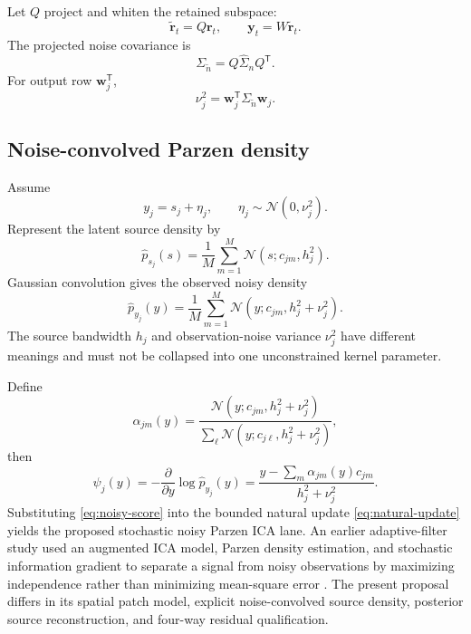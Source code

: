 \documentclass[11pt]{article}
\newcommand{\trans}{\mathsf T}
\begin{document}
Let $Q$ project and whiten the retained subspace:
\begin{equation}
\widetilde{\bm r}_t=Q\bm r_t,
\qquad
\bm y_t=W\widetilde{\bm r}_t.
\end{equation}
The projected noise covariance is
\begin{equation}
\Sigma_{\widetilde n}=Q\widehat\Sigma_nQ^{\trans}.
\end{equation}
For output row $\bm w_j^{\trans}$,
\begin{equation}
\nu_j^2=\bm w_j^{\trans}
\Sigma_{\widetilde n}\bm w_j.
\label{eq:projected-noise}
\end{equation}

\subsection{Noise-convolved Parzen density}

Assume
\begin{equation}
y_j=s_j+\eta_j,
\qquad
\eta_j\sim\mathcal N(0,\nu_j^2).
\end{equation}
Represent the latent source density by
\begin{equation}
\widehat p_{s_j}(s)
=
\frac1M\sum_{m=1}^{M}
\mathcal N(s;c_{jm},h_j^2).
\label{eq:source-parzen}
\end{equation}
Gaussian convolution gives the observed noisy density
\begin{equation}
\widehat p_{y_j}(y)
=
\frac1M\sum_{m=1}^{M}
\mathcal N(y;c_{jm},h_j^2+\nu_j^2).
\label{eq:noisy-parzen}
\end{equation}
The source bandwidth $h_j$ and observation-noise variance $\nu_j^2$ have
different meanings and must not be collapsed into one unconstrained kernel
parameter.

Define
\begin{equation}
\alpha_{jm}(y)
=
\frac{\mathcal N(y;c_{jm},h_j^2+\nu_j^2)}
{\sum_{\ell}\mathcal N(y;c_{j\ell},h_j^2+\nu_j^2)},
\end{equation}
then
\begin{equation}
\psi_j(y)
=
-\frac{\partial}{\partial y}\log\widehat p_{y_j}(y)
=
\frac{y-\sum_m\alpha_{jm}(y)c_{jm}}
{h_j^2+\nu_j^2}.
\label{eq:noisy-score}
\end{equation}
Substituting \cref{eq:noisy-score} into the bounded natural update
\cref{eq:natural-update} yields the proposed stochastic noisy Parzen ICA lane.
An earlier adaptive-filter study used an augmented ICA model, Parzen density
estimation, and stochastic information gradient to separate a signal from noisy
observations by maximizing independence rather than minimizing mean-square error
\cite{yang2007adaptive}. The present proposal differs in its spatial patch model,
explicit noise-convolved source density, posterior source reconstruction, and
four-way residual qualification.
\end{document}
